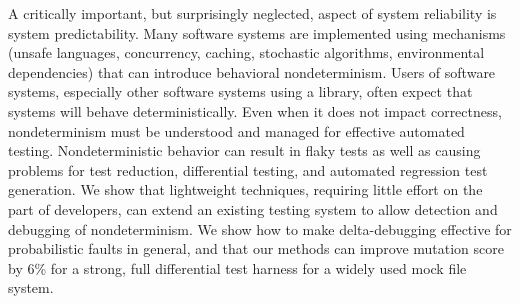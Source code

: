 A critically important, but surprisingly neglected, aspect of system reliability is system predictability.  Many software systems are implemented using mechanisms (unsafe languages, concurrency, caching, stochastic algorithms, environmental dependencies) that can introduce behavioral nondeterminism.  Users of software systems, especially other software systems using a library, often expect that systems will behave deterministically.  Even when it does not impact correctness, nondeterminism must be understood and managed for effective automated testing.  Nondeterministic behavior can result in flaky tests as well as causing problems for test reduction, differential testing, and automated regression test generation.  We show that lightweight techniques, requiring little effort on the part of developers, can extend an existing testing system to allow detection and debugging of nondeterminism.  We show how to make delta-debugging effective for probabilistic faults in general, and that our methods can improve mutation score by 6\% for a strong, full differential test harness for a widely used mock file system.
